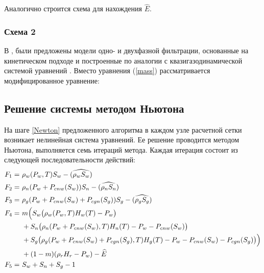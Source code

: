 Аналогично строится схема для нахождения $\widehat{E}$.

\subsubsection*{Схема 2}
В \cite{Mathmod-2010},\cite{Mathmod-2011} были предложены модели одно- и двухфазной фильтрации, основанные на
кинетическом подходе и построенные по аналогии с квазигазодинамической системой
уравнений \cite{Chetverushkin-Mathmod}. Вместо уравнения (\ref{mass}) рассматривается модифицированное
уравнение:

\newpage
\subsection{Решение системы методом Ньютона} На шаге \ref{Newton}
предложенного алгоритма в каждом узле расчетной сетки возникает 
нелинейная система уравнений.
Ее решение проводится методом Ньютона\cite{Kalitkin}, выполняется семь
итераций метода. Каждая итерация 
состоит из следующей последовательности действий:
\begin{eqnarray*}
  \begin{aligned}
    F_1=\ &\rho_w(P_w, T) S_w - (\widehat{\rho_w S_w}) \\
    F_2=\ &\rho_n(P_w+P_{cnw}(S_w)) S_n - (\widehat{\rho_n S_n}) \\
    F_3=\ &\rho_g(P_w+P_{cnw}(S_w)+P_{cgn}(S_g)) S_g - (\widehat{\rho_g S_g}) \\
    F_4=\ & m \Big{(}S_w \big{(}\rho_w(P_w, T) H_w(T) - P_w\big{)} \\
	 &+ S_n \big{(}\rho_n(P_w+P_{cnw}(S_w), T) H_n(T) - P_w - P_{cnw}(S_w)\big{)} \\
	 &+ S_g \big{(}\rho_g(P_w+P_{cnw}(S_w)+P_{cgn}(S_g), T) H_g(T) - P_w - P_{cnw}(S_w) - P_{cgn}(S_g)\big{)}
	 \Big{)}\\
	 &+ (1-m) (\rho_r H_r - P_w) - \widehat{E} \\
    F_5=\ &S_w+S_n+S_g - 1
  \end{aligned}
\end{eqnarray*}
